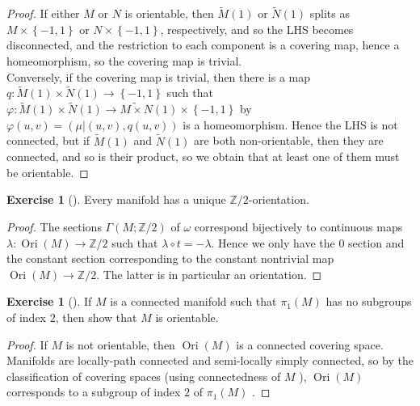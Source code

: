 \documentclass[reqno]{amsart}
\theoremstyle{definition}
\newtheorem{exercise}[theorem]{Exercise}
\theoremstyle{remark}
\DeclareMathOperator{\Ori}{Ori}
\begin{document}
\begin{proof}
    If either $M$ or $N$ is orientable, then
    $\tilde{M}(1)$ or $\tilde{N}(1)$ splits as
    $M \times \left\{ -1,1 \right\} $ or
    $N \times \left\{ -1,1 \right\} $, respectively, and so
    the LHS becomes disconnected, and the restriction to each
    component is a covering map, hence a homeomorphism, so
    the covering map is trivial.\\
    Conversely, if the covering map is trivial,
    then there
    is a map $q \colon 
    \tilde{M}(1) \times \tilde{N}(1) \to \left\{ -1,1 \right\} $ 
    such that
    $\varphi \colon \tilde{M}(1) \times \tilde{N}(1)
    \to \widetilde{M \times N}(1) \times \left\{ -1,1 \right\} $ by
    $\varphi (u,v) = \left( \mu| (u,v), q(u,v) \right) $ 
    is a homeomorphism.
    Hence the LHS is not connected, but if
    $\tilde{M}(1)$ and $\tilde{N}(1)$ are both
    non-orientable, then they are connected, and so is their product,
    so we obtain that at least one of them must be orientable.
    




    
    









\end{proof}

\begin{exercise}[]
    Every manifold has a unique $\mathbb{Z} / 2$-orientation.
\end{exercise}

\begin{proof}
    The sections $\Gamma(M; \mathbb{Z}/2)$ of $\omega$  
    correspond bijectively to continuous maps
    $\lambda \colon \Ori(M) \to \mathbb{Z}/2$ such that
    $\lambda \circ t = - \lambda$. Hence we only have
    the $0$ section and the constant section corresponding to
    the constant nontrivial map $\Ori(M) \to \mathbb{Z}/2$.
    The latter is in particular an orientation.
\end{proof}





\begin{exercise}[]
    If $M$ is a connected manifold such that
    $\pi_1(M)$ has no subgroups of index $2$, then show that
    $M$ is orientable.
\end{exercise}

\begin{proof}
    If $M$ is not orientable, then $\Ori\left( M \right) $ is a connected
    covering space. Manifolds are locally-path connected
    and semi-locally simply connected, so by
    the classification of covering spaces (using connectedness
    of $M$ ), 
    $\Ori(M)$ corresponds to a subgroup of index $2$ of
    $\pi_1(M)$ \cite[Corollary 6.9]{Bredon}.
\end{proof}
\end{document}
